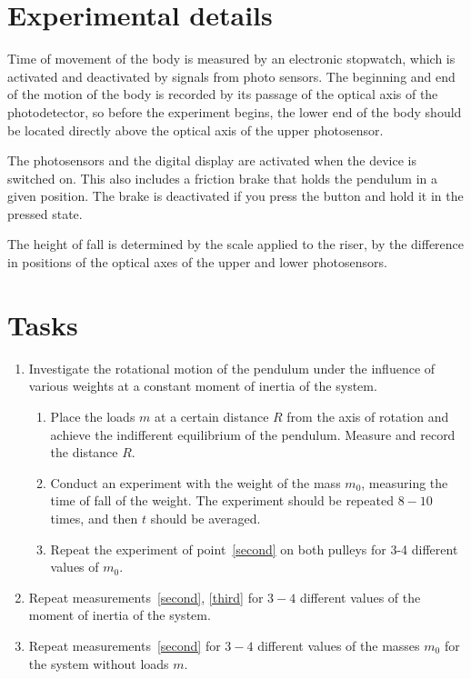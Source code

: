 \documentclass{LabWorkEng}
\begin{document}
\section{Experimental details}

Time of movement of the body is measured by an electronic stopwatch, which is activated and deactivated by signals from photo sensors. The beginning and end of the motion of the body is recorded by its passage of the optical axis of the photodetector, so before the experiment begins, the lower end of the body should be located directly above the optical axis of the upper photosensor. 

The photosensors and the digital display are activated when the device is switched on. This also includes a friction brake that holds the pendulum in a given position. The brake is deactivated if you press the  button and hold it in the pressed state.

The height of fall is determined by the scale applied to the riser, by the difference in positions of the optical axes of the upper and lower photosensors.

\section{Tasks}
\begin{enumerate}
	\item Investigate the rotational motion of the pendulum under the influence of various weights at a constant moment of inertia of the system.
	\begin{enumerate}
		\item\label{first} Place the loads $m$ at a certain distance $R$ from the axis of rotation and achieve the indifferent equilibrium of the pendulum. Measure and record the distance $R$.
		\item\label{second} Conduct an experiment with the weight of the mass $m_0$, measuring the time of fall of the weight. The experiment should be repeated $8-10$ times, and then $t$ should be averaged.
		\item\label{third} Repeat the experiment of point~\ref{second} on both pulleys for 3-4 different values of $m_0$.
	\end{enumerate}
	\item Repeat measurements~\ref{second}, \ref{third} for $3-4$ different values of the moment of inertia of the system.
	\item Repeat measurements~\ref{second} for $3-4$ different values of the masses $m_0$ for the system without loads $m$.
\end{enumerate}
\end{document}
